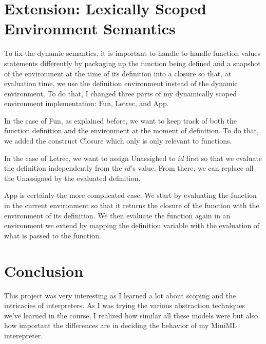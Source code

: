 \documentclass[11pt]{article}
\theoremstyle{definition}
\begin{document}
\section{Extension: Lexically Scoped Environment Semantics}
To fix the dynamic semantics, it is important to handle to handle function values statements differently by packaging up the function being defined and a snapshot of the environment at the time of its definition into a closure so that, at evaluation time, we use the definition environment instead of the dynamic environment. To do that, I changed three parts of my dynamically scoped environment implementation: Fun, Letrec, and App.
\par\indent In the case of Fun, as explained before, we want to keep track of both the function definition and the environment at the moment of definition. To do that, we added the construct Closure which only is only relevant to functions.
\par\indent In the case of Letrec, we want to assign Unassighed to $id$ first so that we evaluate the definition independently from the $id$'s value. From there, we can replace all the Unassigned by the evaluated definition. 
\par\indent App is certainly the more complicated case. We start by evaluating the function in the current environment so that it returns the closure of the function with the environment of its definition. We then evaluate the function again in an environment we extend by mapping the definition variable with the evaluation of what is passed to the function.
\section{Conclusion}
This project was very interesting as I learned a lot about scoping and the intricacies of interpreters. As I was trying the various abstraction techniques we've learned in the course, I realized how similar all these models were but also how important the differences are in deciding the behavior of my MiniML interepreter.
\end{document}
